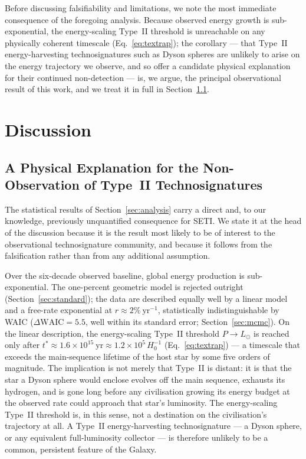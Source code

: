 Before discussing falsifiability and limitations, we note the most immediate consequence
of the foregoing analysis. Because observed energy growth is sub-exponential, the
energy-scaling Type~II threshold is unreachable on any physically coherent timescale
(Eq.~\ref{eq:textrap}); the corollary --- that Type~II energy-harvesting technosignatures
such as Dyson spheres are unlikely to arise on the energy trajectory we observe, and so
offer a candidate physical explanation for their continued non-detection --- is, we argue,
the principal observational result of this work, and we treat it in full in
Section~\ref{sec:technosignatures}.

\section{Discussion}
\label{sec:discussion}

\subsection{A Physical Explanation for the Non-Observation of Type~II Technosignatures}
\label{sec:technosignatures}

The statistical results of Section~\ref{sec:analysis} carry a direct and, to our
knowledge, previously unquantified consequence for SETI. We state it at the head of the
discussion because it is the result most likely to be of interest to the observational
technosignature community, and because it follows from the falsification rather than from
any additional assumption.

Over the six-decade observed baseline, global energy production is sub-exponential. The
one-percent geometric model is rejected outright (Section~\ref{sec:standard}); the data
are described equally well by a linear model and a free-rate exponential at
$r\approx2\%~\mathrm{yr^{-1}}$, statistically indistinguishable by WAIC
($\Delta\mathrm{WAIC}=5.5$, well within its standard error; Section~\ref{sec:mcmc}). On the linear description, the
energy-scaling Type~II threshold $P\to L_\odot$ is reached only after
$t^\ast\approx1.6\times10^{15}~\mathrm{yr}\approx1.2\times10^{5}\,H_0^{-1}$
(Eq.~\ref{eq:textrap}) --- a timescale that exceeds the main-sequence lifetime of the
host star by some five orders of magnitude. The implication is not merely that Type~II is
distant: it is that the star a Dyson sphere would enclose evolves off the main sequence,
exhausts its hydrogen, and is gone long before any civilisation growing its energy budget
at the observed rate could approach that star's luminosity. The energy-scaling Type~II
threshold is, in this sense, not a destination on the civilisation's trajectory at all. A
Type~II energy-harvesting technosignature --- a Dyson sphere, or any equivalent
full-luminosity collector --- is therefore unlikely to be a common, persistent feature of
the Galaxy.

